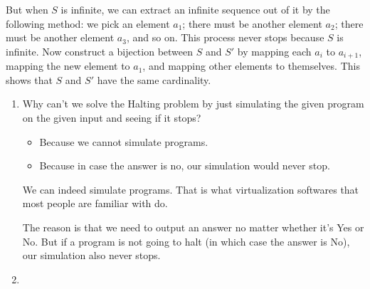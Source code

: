 \documentclass[11pt,preview]{standalone} %
\begin{document}
\begin{enumerate}
\begin{Multi}
	But when $S$ is infinite, we can extract an infinite sequence out of it by the following method: we pick an element $a_1$; there must be another element $a_2$; there must be another element $a_3$, and so on. This process never stops because $S$ is infinite. Now construct a bijection between $S$ and $S'$ by mapping each $a_i$ to $a_{i+1}$, mapping the new element to $a_1$, and mapping other elements to themselves. This shows that $S$ and $S'$ have the same cardinality.
	\end{Multi}

\end{enumerate}


\begin{enumerate}
	\item Why can't we solve the Halting problem by just simulating the given program on the given input and seeing if it stops?
	\begin{Multi}
	\begin{itemize}
		\FalseChoice\item Because we cannot simulate programs.
		\TrueChoice\item Because in case the answer is no, our simulation would never stop.
	\end{itemize}
	\Solution We can indeed simulate programs. That is what virtualization softwares that most people are familiar with do.
	
	The reason is that we need to output an answer no matter whether it's Yes or No. But if a program is not going to halt (in which case the answer is No), our simulation also never stops.
	\end{Multi}
	
	\item 

\end{enumerate}
\end{document}

